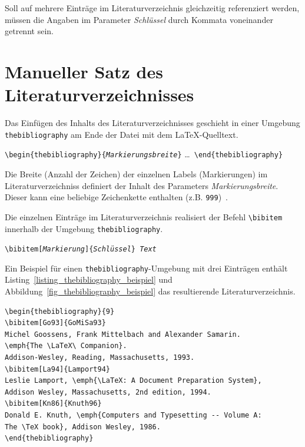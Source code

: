\documentclass[a4paper,10pt,twoside]{scrbook}
\begin{document}
Soll auf mehrere Einträge im Literaturverzeichnis gleichzeitig referenziert werden, müssen die Angaben im Parameter \textsl{Schlüssel} durch Kommata voneinander getrennt sein.


\section{Manueller Satz des Literaturverzeichnisses}
\label{Abschnitt_thebibliography}

Das Einfügen des Inhalts des Literaturverzeichnisses geschieht in einer Umgebung \verb!thebibliography! am Ende der Datei mit dem \LaTeX-Quelltext.

\begin{boxedminipage}{\textwidth}
	\texttt{\textbackslash begin\{thebibliography\}\{\textsl{Markierungsbreite}\}} \enskip \dots\ \enskip \texttt{\textbackslash end\{thebibliography\}} 
\end{boxedminipage}

Die Breite (Anzahl der Zeichen) der einzelnen Labels (Markierungen) im Literaturverzeichniss definiert der Inhalt des Parameters \textsl{Markierungsbreite}. Dieser kann eine beliebige Zeichenkette enthalten (z.B. \verb|999|)~\cite{voss2007referenz}.

Die einzelnen Einträge im Literaturverzeichnis realisiert der Befehl \verb|\bibitem| innerhalb der Umgebung \verb!thebibliography!. 

\begin{boxedminipage}{\textwidth}
	\texttt{\textbackslash bibitem[\textsl{Markierung}]\{\textsl{Schlüssel}\} \textsl{Text}} 
\end{boxedminipage}

Ein Beispiel für einen \verb!thebibliography!-Umgebung mit drei Einträgen enthält Listing~\ref{listing_thebibliography_beispiel} und  Abbildung~\ref{fig_thebibliography_beispiel} das resultierende Literaturverzeichnis.

\begin{lstlisting}[caption={Das allererste Beispiel},label=listing_thebibliography_beispiel, style=customlatex]
\begin{thebibliography}{9}
\bibitem[Go93]{GoMiSa93} 
Michel Goossens, Frank Mittelbach and Alexander Samarin. 
\emph{The \LaTeX\ Companion}. 
Addison-Wesley, Reading, Massachusetts, 1993.
\bibitem[La94]{Lamport94}
Leslie Lamport,	\emph{\LaTeX: A Document Preparation System},	
Addison Wesley, Massachusetts, 2nd edition, 1994.
\bibitem[Kn86]{Knuth96} 
Donald E. Knuth, \emph{Computers and Typesetting -- Volume A: 
The \TeX book}, Addison Wesley, 1986.
\end{thebibliography}
\end{lstlisting}
\end{document}
